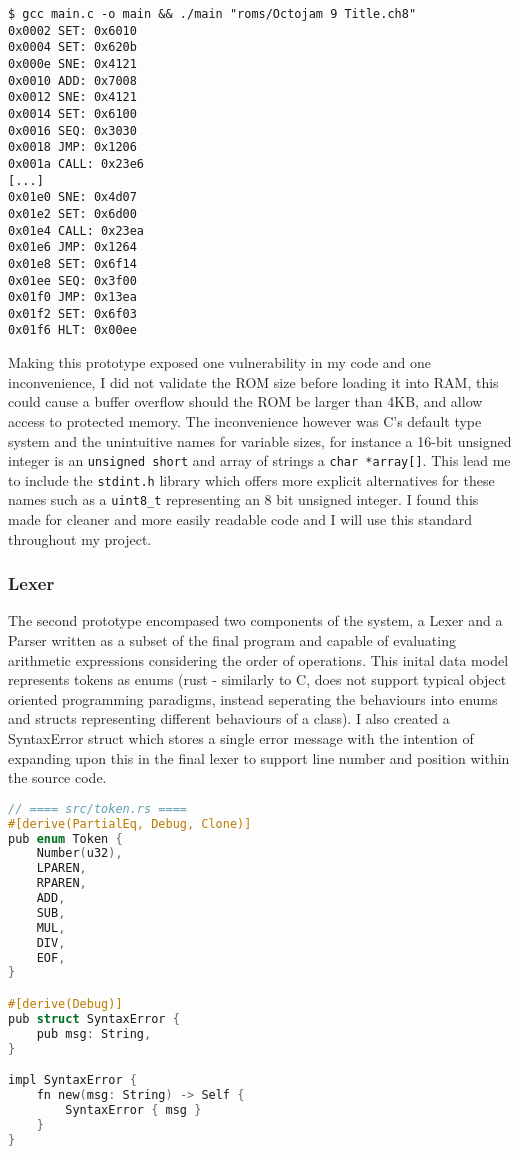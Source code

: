 \begin{lstlisting}
$ gcc main.c -o main && ./main "roms/Octojam 9 Title.ch8"
0x0002 SET: 0x6010
0x0004 SET: 0x620b
0x000e SNE: 0x4121
0x0010 ADD: 0x7008
0x0012 SNE: 0x4121
0x0014 SET: 0x6100
0x0016 SEQ: 0x3030
0x0018 JMP: 0x1206
0x001a CALL: 0x23e6
[...]
0x01e0 SNE: 0x4d07
0x01e2 SET: 0x6d00
0x01e4 CALL: 0x23ea
0x01e6 JMP: 0x1264
0x01e8 SET: 0x6f14
0x01ee SEQ: 0x3f00
0x01f0 JMP: 0x13ea
0x01f2 SET: 0x6f03
0x01f6 HLT: 0x00ee
\end{lstlisting}

Making this prototype exposed one vulnerability in my code and one inconvenience, I did not validate the ROM size before loading it into RAM, this could cause a buffer overflow should the ROM be larger than 4KB, and allow access to protected memory. The inconvenience however was C's default type system and the unintuitive names for variable sizes, for instance a 16-bit unsigned integer is an \texttt{unsigned short} and array of strings a \texttt{char *array[]}. This lead me to include the \texttt{stdint.h} library which offers more explicit alternatives for these names such as a \texttt{uint8\_t} representing an 8 bit unsigned integer. I found this made for cleaner and more easily readable code and I will use this standard throughout my project. 

\subsubsection{Lexer}
The second prototype encompased two components of the system, a Lexer and a Parser written as a subset of the final program and capable of evaluating arithmetic expressions considering the order of operations. This inital data model represents tokens as enums (rust - similarly to C, does not support typical object oriented programming paradigms, instead seperating the behaviours into enums and structs representing different behaviours of a class). I also created a SyntaxError struct which stores a single error message with the intention of expanding upon this in the final lexer to support line number and position within the source code.

\begin{lstlisting}[language={C}]
// ==== src/token.rs ====
#[derive(PartialEq, Debug, Clone)]
pub enum Token {
    Number(u32),
    LPAREN,
    RPAREN,
    ADD,
    SUB,
    MUL,
    DIV,
    EOF,
}

#[derive(Debug)]
pub struct SyntaxError {
    pub msg: String,
}

impl SyntaxError {
    fn new(msg: String) -> Self {
        SyntaxError { msg }
    }
}
\end{lstlisting}

